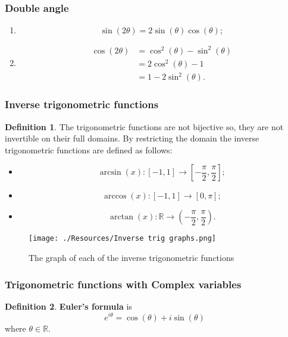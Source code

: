 \documentclass[12pt, a4paper]{article}
\newcommand{\bb}[1]{\mathbb{#1}}
\newcommand{\f}[2]{\frac{#1}{#2}}
\theoremstyle{definition}
\newtheorem{definition}{Definition}[section]
\theoremstyle{plain}
\begin{document}
\subsubsection*{Double angle}

\begin{enumerate}
	
	\item $$\sin(2\theta)=2\sin(\theta)\cos(\theta);$$

	\item $$\begin{aligned}
	\cos(2\theta)&=\cos^2(\theta)-\sin^2(\theta) \\
			&= 2\cos^2(\theta)-1 \\
			&= 1-2\sin^2(\theta).
	\end{aligned}$$

\end{enumerate}

\subsubsection{Inverse trigonometric functions}

\begin{definition}
The trigonometric functions are not bijective so, they are not invertible on their full domains. By restricting the domain the inverse trigonometric functions are defined as follows: \begin{itemize}
	\item $$\arcsin(x):[-1,1]\to\left[-\f{\pi}{2},\f{\pi}{2}\right];$$
	\item $$\arccos(x):[-1,1]\to\left[0,\pi\right];$$
	\item $$\arctan(x):\bb{R} \to \left(-\f{\pi}{2},\f{\pi}{2}\right).$$
\end{itemize}
\end{definition}

\begin{figure}[H]
\centering
\texttt{[image: ./Resources/Inverse trig graphs.png]}
\caption{The graph of each of the inverse trigonometric functions}
\label{fig:inverse trig graphs}
\end{figure}

\subsubsection{Trigonometric functions with Complex variables}

\begin{definition}
\textbf{Euler's formula} is $$e^{i\theta}=\cos(\theta)+i\sin(\theta)$$ where $\theta\in\bb{R}.$
\end{definition}
\end{document}
